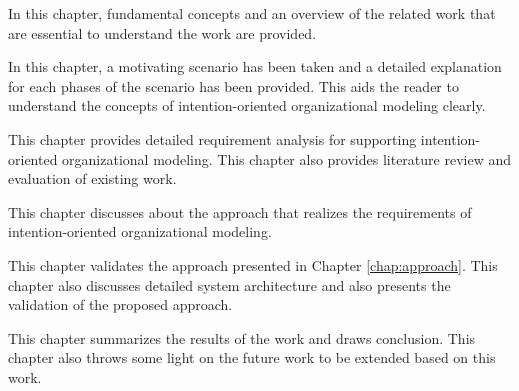 \begin{description} [labelwidth = 0.07\textwidth]
	\item[Chapter ~\ref{chap:fundamentals} -- \nameref{chap:fundamentals}:] In this chapter, fundamental concepts and an overview of the related work that are essential to understand the work are provided.
	\item[Chapter ~\ref{chap:motivatingScenario} -- \nameref{chap:motivatingScenario}:] In this chapter, a motivating scenario has been taken and a detailed explanation for each phases of the scenario has been provided. This aids the reader to understand the concepts of intention-oriented organizational modeling clearly. 
	\item [Chapter ~\ref{chap:analysis} -- \nameref{chap:analysis}:] This chapter provides detailed requirement analysis for supporting intention-oriented organizational modeling. This chapter also provides literature review and evaluation of existing work.
	\item[Chapter ~\ref{chap:approach} -- \nameref{chap:approach}:] This chapter discusses about the approach that realizes the requirements  of intention-oriented organizational modeling.
	\item[Chapter ~\ref{chap:casestudy} -- \nameref{chap:casestudy}:] This chapter validates the approach presented in Chapter \ref{chap:approach}. This chapter also discusses detailed system architecture and also presents the validation of the proposed approach. 	
	\item[Chapter ~\ref{chap:conclusion} -- \nameref{chap:conclusion}:] This chapter summarizes the results of the work and draws conclusion. This chapter also throws some light on the future work to be extended based on this work. 
\end{description}